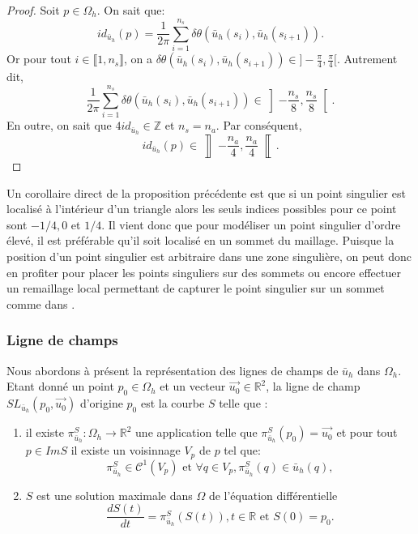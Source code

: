 \begin{proof}
Soit $p\in\Omega_h$. On sait que:
$$
id_{\bar{u}_h}(p)=\displaystyle\frac{1}{2\pi}\sum_{i=1}^{n_s}\delta\theta(\bar{u}_h(s_i),\bar{u}_h(s_{i+1})).
$$
Or pour tout $i\in\llbracket 1, n_s\rrbracket$, on a $\delta\theta(\bar{u}_h(s_i),\bar{u}_h(s_{i+1}))\in]-\frac{\pi}{4}, \frac{\pi}{4}[$. Autrement dit,
$$
\displaystyle\frac{1}{2\pi}\sum_{i=1}^{n_s}\delta\theta(\bar{u}_h(s_i),\bar{u}_h(s_{i+1}))\in\left]-\frac{n_s}{8}, \frac{n_s}{8}\right[.
$$
En outre, on sait que $4id_{\bar{u}_h}\in\mathbb{Z}$ et $n_s=n_a$. Par conséquent,
$$
id_{\bar{u}_h}(p)\in\left\rrbracket-\frac{n_a}{4}, \frac{n_a}{4}\right\llbracket.
$$
\end{proof}
Un corollaire direct de la proposition précédente est que si un point singulier est localisé à l'intérieur d'un triangle alors les seuls indices possibles pour ce point sont $-1/4, 0$ et $1/4$. Il vient donc que pour modéliser un point singulier d'ordre élevé, il est préférable qu'il soit localisé en un sommet du maillage. Puisque la position d'un point singulier est arbitraire dans une zone singulière, on peut donc en profiter pour placer les points singuliers sur des sommets ou encore effectuer un remaillage local permettant de capturer le point singulier sur un sommet comme dans \cite{jezdimirovic2021quad}.

\subsubsection*{Ligne de champs}
Nous abordons à présent la représentation des lignes de champs de $\bar{u}_h$ dans $\Omega_h$. Etant donné un point $p_0\in\Omega_h$ et un vecteur $\overrightarrow{u_0}\in\mathbb{R}^2$, la ligne de champ $SL_{\bar{u}_h}(p_0, \overrightarrow{u_0})$ d'origine $p_0$ est la courbe $S$ telle que :

\begin{enumerate}
\item il existe $\pi_{\bar{u}_h}^S:\Omega_h\longrightarrow\mathbb{R}^2$ une application telle que $\pi_{\bar{u}_h}^S(p_0)=\overrightarrow{u_0}$ et pour tout $p\in Im S$ il existe un voisinnage $V_p$ de $p$ tel que:
\begin{equation}
\pi_{\bar{u}_h}^S\in\mathcal{C}^1(V_p) \mbox{ et }  \forall q\in V_p, \pi_{\bar{u}_h}^S(q)\in \bar{u}_h(q),
\end{equation}
\item $S$ est une solution maximale dans $\Omega$ de l'équation différentielle
\begin{equation}
\frac{dS(t)}{dt}=\pi_{\bar{u}_h}^S(S(t)),t\in \mathbb{R} \text{ et }  S(0)=p_0.
\label{eqn:stream_equation}
\end{equation}
\end{enumerate}


